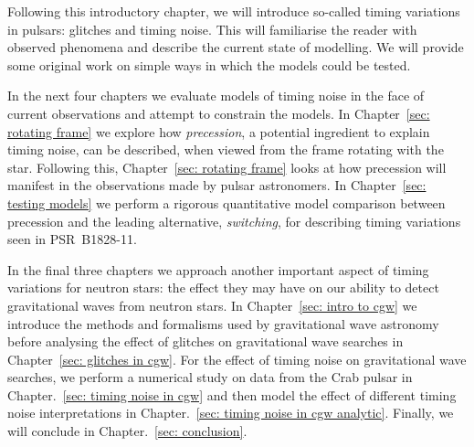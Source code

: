 \documentclass[../full_thesis/full_thesis.tex]{subfiles}
\begin{document}
Following this introductory chapter, we will introduce so-called timing
variations in pulsars: glitches and timing noise. This will familiarise the
reader with observed phenomena and describe the current state of modelling.  We
will provide some original work on simple ways in which the models could be
tested.

In the next four chapters we evaluate models of timing noise in the face of
current observations and attempt to constrain the models.  In Chapter~\ref{sec:
rotating frame} we explore how \emph{precession}, a potential ingredient to
explain timing noise, can be described, when viewed from the frame rotating
with the star. Following this, Chapter~\ref{sec: rotating frame} looks at how
precession will manifest in the observations made by pulsar astronomers. In
Chapter~\ref{sec: testing models} we perform a rigorous quantitative model
comparison between precession and the leading alternative, \emph{switching},
for describing timing variations seen in PSR~B1828-11.

In the final three chapters we approach another important aspect of timing
variations for neutron stars: the effect they may have on our ability to detect
gravitational waves from neutron stars. In Chapter~\ref{sec: intro to cgw} we
introduce the methods and formalisms used by gravitational wave astronomy
before analysing the effect of glitches on gravitational wave searches in
Chapter~\ref{sec: glitches in cgw}. For the effect of timing noise on
gravitational wave searches, we perform a numerical study on data from the Crab
pulsar in Chapter.~\ref{sec: timing noise in cgw} and then model the effect of
different timing noise interpretations in Chapter.~\ref{sec: timing noise in
cgw analytic}. Finally, we will conclude in Chapter.~\ref{sec: conclusion}.

\biblio
\end{document}
